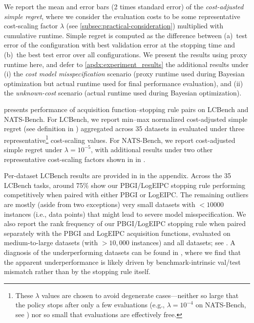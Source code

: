 We report the mean and error bars (2 times standard error) of the \emph{cost-adjusted simple regret}, where we consider the evaluation costs to be some representative cost-scaling factor $\lambda$ (see \cref{subsec:practical-consideration}) multiplied with cumulative runtime.
Simple regret is computed as the difference between (a)~test error of the configuration with best validation error at the stopping time and (b)~the best test error over all configurations.
We present the results using proxy runtime here, and defer to \cref{apdx:experiment_results} the additional results under (i) the \emph{cost model misspecification} scenario (proxy runtime used during Bayesian optimization but actual runtime used for final performance evaluation), and (ii) the \emph{unknown-cost} scenario (actual runtime used during Bayesian optimization).

 presents performance of acquisition function--stopping rule pairs on LCBench and NATS-Bench. For LCBench, we report min–max normalized cost-adjusted simple regret (see definition in ) aggregated across 35 datasets in  evaluated under three representative\footnote{These $\lambda$ values are chosen to avoid degenerate cases—neither so large that the policy stops after only a few evaluations (e.g., $\lambda = 10^{-4}$ on NATS-Bench, see ) nor so small that evaluations are effectively free.} cost-scaling values. For NATS-Bench, we report cost-adjusted simple regret under $\lambda = 10^{-5}$, with additional results under two other representative cost-scaling factors shown in  in .

Per-dataset LCBench results are provided in  in the appendix. Across the 35 LCBench tasks, around 75\% show our PBGI/LogEIPC stopping rule performing competitively when paired with either PBGI or LogEIPC. The remaining outliers are mostly (aside from two exceptions) very small datasets with $<10000$ instances (i.e., data points) that might lead to severe model misspecification. We also report the rank frequency of our PBGI/LogEIPC stopping rule when paired separately with the PBGI and LogEIPC acquisition functions, evaluated on medium-to-large datasets (with $> 10{,}000$ instances) and all datasets; see . A diagnosis of the underperforming datasets can be found in , where we find that the apparent underperformance is likely driven by benchmark-intrinsic val/test mismatch rather than by the stopping rule itself.

